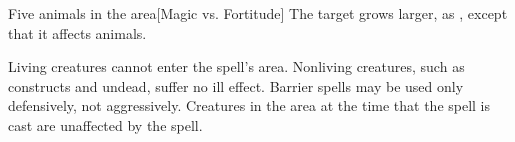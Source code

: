 \begin{spelltarget}{Five animals in the area}[Magic vs. Fortitude]
    \spellsuccess The target grows larger, as , except that it affects animals.
\end{spelltarget}

\begin{comment}
\spellsection{Animate Objects}{5}
\spelldesc{You imbue inanimate objects with mobility and a semblance of life.}
\spellinfo{Trans (Animation)}{Chaos, Trans}
\spelltwocol{\spelllimit{\areamed radius}}{\spellrng{\rngmed}}
\spelltgts{One Small object/level in the area; see text}
\spelldur{\durshort}
\spelleffect Each animated object immediately attacks whomever or whatever you initially designate. Your control of the objects is limited to simple commands (``Attack,'' ``Defend,'' ``Stop,'' and so forth).
\par An animated object can be of any nonmagical material. You may animate one Small or smaller object or an equivalent number of larger objects per caster level. A Medium object counts as two Small or smaller objects, a Large object as four, a Huge object as eight, a Gargantuan object as sixteen, and a Colossal object as thirty-two. You can give the objects new commands as a move action, as normal for directing an active spell.
\spellnotes This spell cannot animate objects carried or worn by a creature. This spell can be made permanent with a \spell{permanency} ritual.

\spellsection{Animate Plants}{5}
\spelldesc{You imbue inanimate plants with mobility and a semblance of life.}
\spellinfo{Trans (Animation)}{Nature, Plant}
\spellsr{No}
\begin{spelltargets}{Up to one Small plant/level in the area; see text}
    \spelleffect This spell functions like \spell{animate objects}, except that you animate plants instead of inanimate objects.
\end{spelltargets}
\spellnotes \spell{Animate plants} cannot affect plant creatures, nor does it affect nonliving vegetable material.
\end{comment}

\spelldur{\durlong \dismissable}
\spellline
\spelleffect Living creatures cannot enter the spell's area. Nonliving creatures, such as constructs and undead, suffer no ill effect.
\spellnotes Barrier spells may be used only defensively, not aggressively. Creatures in the area at the time that the spell is cast are unaffected by the spell.

